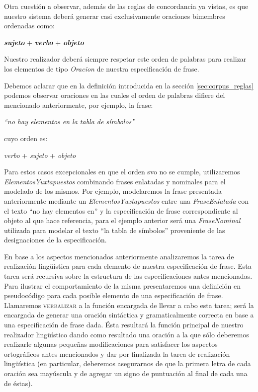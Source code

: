 \bigskip
Otra cuestión a observar, además de las reglas de concordancia ya vistas, es que nuestro sistema deberá generar casi exclusivamente oraciones bimembres ordenadas como:

\begin{center}
\emph{\textbf{sujeto}} + \emph{\textbf{verbo}} + \emph{\textbf{objeto}}
\end{center}

\noindent
Nuestro realizador deberá siempre respetar este orden de palabras para realizar los elementos de tipo \emph{Oracion} de nuestra especificación de frase. 

Debemos aclarar que en la definición introducida en la sección \ref{sec:corpus_reglas} podemos observar oraciones en las cuales el orden de palabras difiere del mencionado anteriormente, por ejemplo, la frase:

\begin{center}
\emph{``no hay elementos en la tabla de símbolos''}
\end{center}

\noindent
cuyo orden es: 

\begin{center}
\emph{verbo} + \emph{sujeto} + \emph{objeto}
\end{center}

Para estos casos excepcionales en que el orden svo no se cumple, utilizaremos \textit{ElementosYuxtapuestos} combinando frases enlatadas y nominales para el modelado de los mismos. Por ejemplo, modelaremos la frase presentada anteriormente mediante un \emph{ElementosYuxtapuestos} entre una \emph{FraseEnlatada} con el texto ``no hay elementos en'' y la especificación de frase correspondiente al objeto al que hace referencia, para el ejemplo anterior será una \emph{FraseNominal} utilizada para modelar el texto ``la tabla de símbolos'' proveniente de las designaciones de la especificación.


\bigskip
En base a los aspectos mencionados anteriormente analizaremos la tarea de realización lingüística para cada elemento de nuestra especificación de frase. Esta tarea será recursiva sobre la estructura de las especificaciones antes mencionadas. Para ilustrar el comportamiento de la misma presentaremos una definición en pseudocódigo para cada posible elemento de una especificación de frase. Llamaremos \textsc{verbalizar} a la función encargada de llevar a cabo esta tarea; será la encargada de generar una oración sintáctica y gramaticalmente correcta  en base a una especificación de frase dada. Ésta resultará la función principal de nuestro realizador lingüístico dando como resultado una oración a la que sólo deberemos realizarle algunas pequeñas modificaciones para satisfacer los aspectos ortográficos antes mencionados y dar por finalizada la tarea de realización lingüística (en particular, deberemos asegurarnos de que la primera letra de cada oración sea mayúscula y de agregar un signo de puntuación al final de cada una de éstas).

